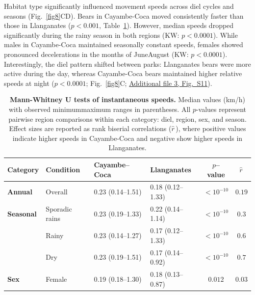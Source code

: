 \documentclass[lineno,referee,pdflatex,sn-vancouver-num]{sn-jnl}%
\theoremstyle{thmstyleone}%
\theoremstyle{thmstyletwo}%
\theoremstyle{thmstylethree}%
\begin{document}
Habitat type significantly influenced movement speeds across diel cycles and seasons (Fig.~\ref{fig8}C\textendash D). Bears in Cayambe-Coca moved consistently faster than those in Llanganates ($p < 0.001$, Table~\ref{table2}). However, median speeds dropped significantly during the rainy season in both regions (KW: $p < 0.0001$). While males in Cayambe-Coca maintained seasonally constant speeds, females showed pronounced decelerations in the months of June\textendash August (KW: $p < 0.0001$). Interestingly, the diel pattern shifted between parks: Llanganates bears were more active during the day, whereas Cayambe-Coca bears maintained higher relative speeds at night ($p<0.0001$; Fig.~\ref{fig8}C; \hyperref[S3_File]{Additional file 3, Fig.~S11}).

\begin{table}[h]
  \caption{\textbf{Mann-Whitney U tests of instantaneous speeds.}
    Median values (km/h) with observed minimum\textendash maximum ranges in parentheses. All $p$-values represent pairwise region comparisons within each category: diel, region, sex, and season. Effect sizes are reported as rank biserial correlations ($\widehat{r}^{\,}$), where  positive values indicate higher speeds in Cayambe-Coca and negative show higher speeds in Llanganates.}
  \label{table2}
  \small\setlength{\tabcolsep}{4pt}%
  \begin{tabular}{|l|l|l|l|c|c|}
    \hline
    \textbf{Category}   & \textbf{Condition}  & \textbf{Cayambe--Coca} & \textbf{Llanganates}                  & \textbf{$p$--value}  & \textbf{$\widehat{r}^{\,}$} \\ \hline
    \textbf{Annual}     & Overall             & 0.23 (0.14--1.51)      & 0.18 (0.12--1.33)                     & $< 10^{-10}$         &   $0.19$                   \\ \hline
    \textbf{Seasonal}   & Sporadic rains      & 0.23 (0.19--1.33)      & 0.22 (0.14--1.14)                     & $< 10^{-10}$         &   $0.3$                    \\
                        & Rainy               & 0.23 (0.14--1.27)      & 0.17 (0.12--1.33)                     & $< 10^{-10}$         &   $0.6$                    \\
                        & Dry                 & 0.23 (0.19--1.51)      & 0.17 (0.14--0.92)                     & $< 10^{-10}$         &   $0.7$                    \\ \hline
    \textbf{Sex}        & Female              & 0.19 (0.18--1.30)      & 0.18 (0.13--0.87)                     & $0.012$              &   $0.03$                  \\

\end{tabular}
\end{table}
\end{document}
